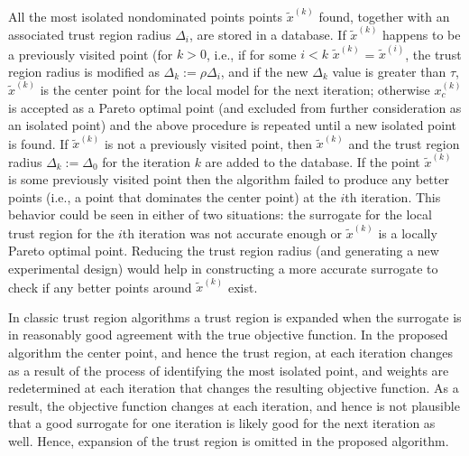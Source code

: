 All the most isolated nondominated points points ${\tilde x}^{(k)}$ found,
together with an associated trust region radius $\Delta_i$, are stored in a
database. If  ${\tilde x} ^{(k)}$ happens to be a previously visited point (for
$k > 0$, i.e., if for some $i < k$  ${\tilde x}^{(k)}$ = ${\tilde x}^{(i)}$,
the trust region radius is modified as $\Delta_k := \rho\Delta_i$, and if the
new $\Delta_k$ value is greater than $\tau$,  ${\tilde x}^{(k)}$ is the center
point for the local model for the next iteration; otherwise $x_c^{(k)}$ is
accepted as a Pareto optimal point (and excluded from further consideration as
an isolated point) and the above procedure is repeated until a new isolated
point is found. If ${\tilde x}^{(k)}$ is not a previously visited point, 
then ${\tilde x}^{(k)}$ and the trust region radius $\Delta_k := \Delta_0$  
for the iteration $k$ are added to the database. If the point ${\tilde x}^{(k)}$ 
is some previously visited point then the algorithm failed to produce any 
better points (i.e., a point that dominates the center point) at the $i$th
iteration. This behavior could be seen in either of two situations: the
surrogate for the local trust region for the $i$th iteration was not
accurate enough or ${\tilde x}^{(k)}$ is a locally Pareto optimal point.
Reducing the trust region radius (and generating a new experimental design)
would help in constructing a more accurate surrogate to check if any better
points around ${\tilde x}^{(k)}$ exist.  \smallskip

In classic trust region algorithms a trust region is expanded when the surrogate 
is in reasonably good agreement with the true objective function. In the 
proposed algorithm the center point, and hence the trust region, at each 
iteration changes as a result of the process of identifying the most isolated 
point, and weights are redetermined at each iteration that changes the resulting 
objective function. As a result, the objective function changes 
at each iteration, and hence is not plausible that a good surrogate for 
one iteration is likely good for the next iteration as well. Hence, expansion 
of the trust region is omitted in the proposed algorithm. \smallskip

\smallskip

